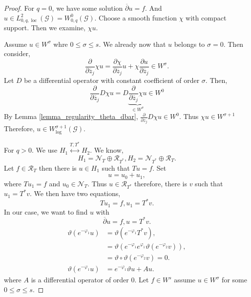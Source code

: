 \documentclass{article}
\DeclareMathOperator{\loc}{loc}
\newcommand{\G}[0]{\mathcal{G}}
\newcommand{\pd}[2]{{\frac {\partial#1} {\partial#2}}}
\begin{document}
\begin{proof}
  For $q=0$, we have some solution $\overline{\partial}u=f$. And $u\in L^2_{0,q,\loc}(\G)=W^0_{0,q}(\G)$. Choose a smooth function $\chi$ with compact support. Then we examine, $\chi u$. 
  \par Assume $u\in W^\sigma$ whre $0\leq \sigma\leq s$. We already now that $u$ belongs to $\sigma=0$. Then consider,
  \begin{equation*}
    \pd{}{\overline{z}_j}\chi u = \pd{\chi}{\overline{z}_j}u+\chi\pd{u}{\overline{z}_j}\in W^\sigma.
  \end{equation*}
  Let $D$ be a differential operator with constant coefficient of order $\sigma$. Then,
  \begin{equation*}
    \pd{}{\overline{z}_j}D\chi u = D\underbrace{\pd{}{\overline{z}_j}\chi u}_{\in W^{\sigma}}\in W^{0}
  \end{equation*}
  By Lemma \ref{lemma_regularity_theta_dbar}, $\pd{}{z_j}D\chi u\in W^0$. Thus $\chi u\in W^{\sigma+1}$ Therefore, $u\in W^{\sigma+1}_{\log}(\G)$.
  \par For $q>0$. We use $H_1\stackrel{T,T^*}{\leftrightarrow}H_2$. 
  We know,
  \begin{equation*}
    H_1 = \mathcal{N}_T\oplus\mathcal{R}_{T^*},H_2 = \mathcal{N}_{T^*}\oplus\mathcal{R}_T.
  \end{equation*}
  Let $f\in\mathcal{R}_T$ then there is $u\in H_1$ such that $Tu=f$. Set 
  \begin{equation*}
    u = u_0+u_1,
  \end{equation*}
  where $Tu_1=f$ and $u_0\in\mathcal{N}_T$. Thus $u\in\mathcal{R}_{T^*}$ therefore, there is $v$ such that $u_1=T^*v$.  We then have two equations,
  \begin{equation*}
    Tu_1 = f,u_1 = T^*v.
  \end{equation*}
  In our case, we want to find $u$ with 
  \begin{equation*}
    \overline{\partial}u = f,u=T^*v.
  \end{equation*}
  \begin{align*}
    \vartheta(e^{-\varphi_1}u) & = \vartheta(e^{-\varphi_1}T^*v),\\
    & = \vartheta(e^{-\varphi_1}e^{\varphi_1}\vartheta(e^{-\varphi_2}v)),\\
    & = \vartheta\circ\vartheta(e^{-\varphi_2}v)=0.\\
    \vartheta(e^{-\varphi_1}u) & = e^{-\varphi_1}\vartheta u+Au.
  \end{align*}
  where $A$ is a differential operator of order $0$. Let $f\in W^s$ assume $u\in W^\sigma$ for some $0\leq \sigma\leq s$. 

\end{proof}
\end{document}
